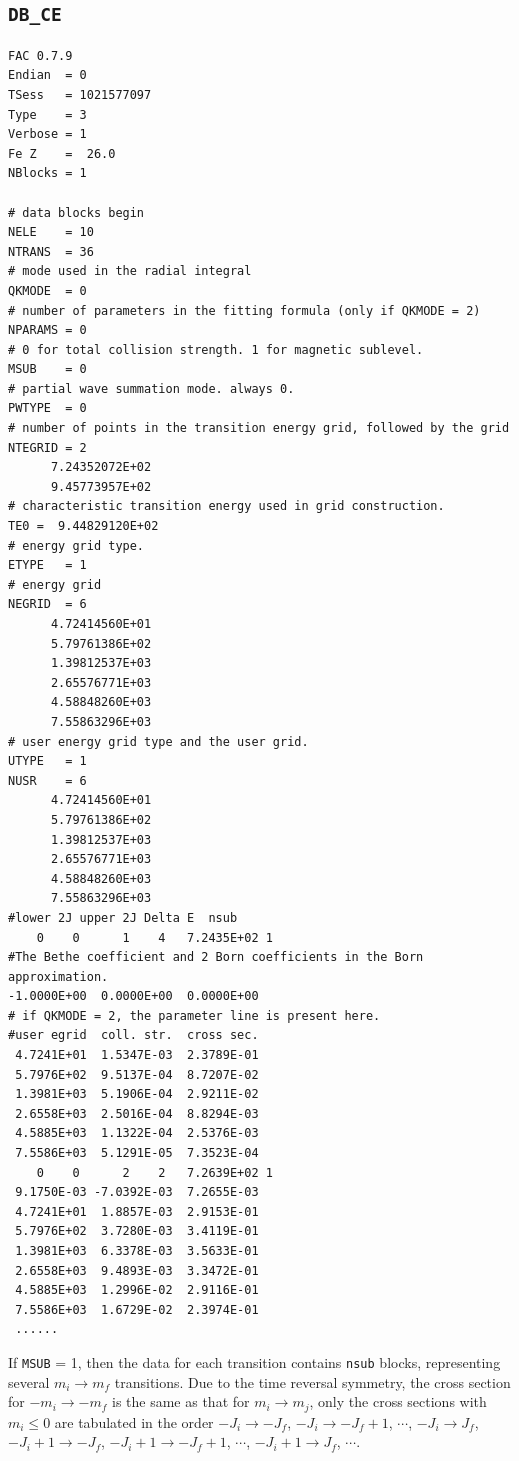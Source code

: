 \documentclass[twoside,letterpaper]{refrep}
\begin{document}
\subsection{\texttt{DB\_CE}}
\begin{verbatim}
FAC 0.7.9
Endian	= 0
TSess	= 1021577097
Type	= 3
Verbose	= 1
Fe Z	=  26.0
NBlocks	= 1

# data blocks begin
NELE	= 10
NTRANS	= 36
# mode used in the radial integral
QKMODE	= 0
# number of parameters in the fitting formula (only if QKMODE = 2)
NPARAMS	= 0
# 0 for total collision strength. 1 for magnetic sublevel.
MSUB	= 0
# partial wave summation mode. always 0. 
PWTYPE	= 0
# number of points in the transition energy grid, followed by the grid
NTEGRID	= 2
	  7.24352072E+02
	  9.45773957E+02
# characteristic transition energy used in grid construction.
TE0	=  9.44829120E+02
# energy grid type. 
ETYPE	= 1
# energy grid
NEGRID	= 6
	  4.72414560E+01
	  5.79761386E+02
	  1.39812537E+03
	  2.65576771E+03
	  4.58848260E+03
	  7.55863296E+03
# user energy grid type and the user grid.
UTYPE	= 1
NUSR	= 6
	  4.72414560E+01
	  5.79761386E+02
	  1.39812537E+03
	  2.65576771E+03
	  4.58848260E+03
	  7.55863296E+03
#lower 2J upper 2J Delta E  nsub
    0	 0	    1	 4	 7.2435E+02	1
#The Bethe coefficient and 2 Born coefficients in the Born approximation.
-1.0000E+00  0.0000E+00  0.0000E+00
# if QKMODE = 2, the parameter line is present here.
#user egrid  coll. str.  cross sec.
 4.7241E+01	 1.5347E-03	 2.3789E-01
 5.7976E+02	 9.5137E-04	 8.7207E-02
 1.3981E+03	 5.1906E-04	 2.9211E-02
 2.6558E+03	 2.5016E-04	 8.8294E-03
 4.5885E+03	 1.1322E-04	 2.5376E-03
 7.5586E+03	 5.1291E-05	 7.3523E-04
    0	 0	    2	 2	 7.2639E+02	1
 9.1750E-03 -7.0392E-03  7.2655E-03
 4.7241E+01	 1.8857E-03	 2.9153E-01
 5.7976E+02	 3.7280E-03	 3.4119E-01
 1.3981E+03	 6.3378E-03	 3.5633E-01
 2.6558E+03	 9.4893E-03	 3.3472E-01
 4.5885E+03	 1.2996E-02	 2.9116E-01
 7.5586E+03	 1.6729E-02	 2.3974E-01
 ......
\end{verbatim}

If \texttt{MSUB} = 1, then the data for each transition contains \texttt{nsub}
blocks, representing several $m_i\to m_f$ transitions. Due to the time
reversal symmetry, the cross section for $-m_i \to -m_f$ is the same as that
for $m_i \to m_j$, only the cross sections with $m_i \le 0$ are tabulated in
the order $-J_i\to -J_f$, $-J_i\to -J_f+1$, $\cdots$, $-J_i\to J_f$,
$-J_i+1\to -J_f$, $-J_i+1\to -J_f+1$, $\cdots$, $-J_i+1\to J_f$, $\cdots$.
\end{document}
